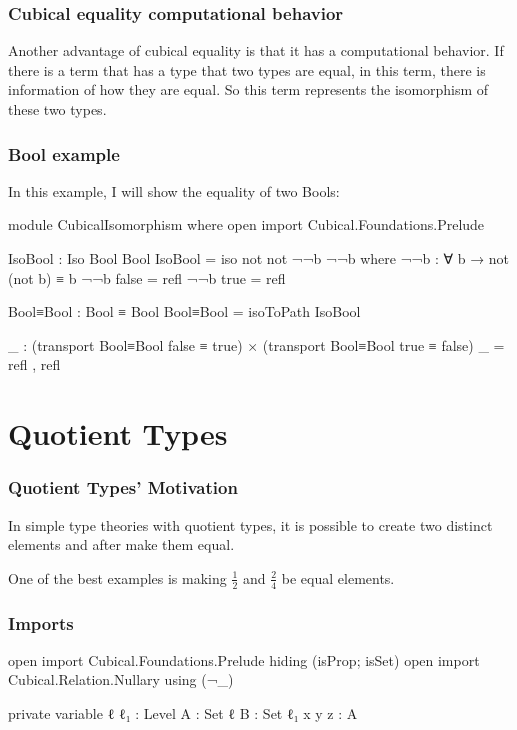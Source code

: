 \documentclass{beamer}
\begin{document}
\begin{frame}
  \frametitle{Cubical equality computational behavior}
  Another advantage of cubical equality is that it has a computational behavior.
  If there is a term that has a type that two types are equal, in this term, there is information of how they are equal.
  So this term represents the isomorphism of these two types.
\end{frame}

\begin{frame}
  \frametitle{Bool example}

  In this example, I will show the equality of two Bools:

  \begin{code}
  module CubicalIsomorphism where
    open import Cubical.Foundations.Prelude

    IsoBool : Iso Bool Bool
    IsoBool = iso not not ¬¬b ¬¬b
      where
        ¬¬b : ∀ b → not (not b) ≡ b
        ¬¬b false = refl
        ¬¬b true = refl

    Bool≡Bool : Bool ≡ Bool
    Bool≡Bool = isoToPath IsoBool

    _ : (transport Bool≡Bool false ≡ true)
      × (transport Bool≡Bool true ≡ false)
    _ = refl , refl

  \end{code}
\end{frame}

\section{Quotient Types}

\begin{frame}
  \frametitle{Quotient Types' Motivation}
  In simple type theories with quotient types,
  it is possible to create two distinct elements and after
  make them equal.

  One of the best examples is making $ \frac{1}{2} $ and $ \frac{2}{4} $ be equal elements.
\end{frame}

\begin{frame}
  \frametitle{Imports}
  \begin{code}

  open import Cubical.Foundations.Prelude hiding (isProp; isSet)
  open import Cubical.Relation.Nullary using (¬_)

  private variable
    ℓ ℓ₁ : Level
    A : Set ℓ
    B : Set ℓ₁
    x y z : A
  \end{code}
\end{frame}
\end{document}
